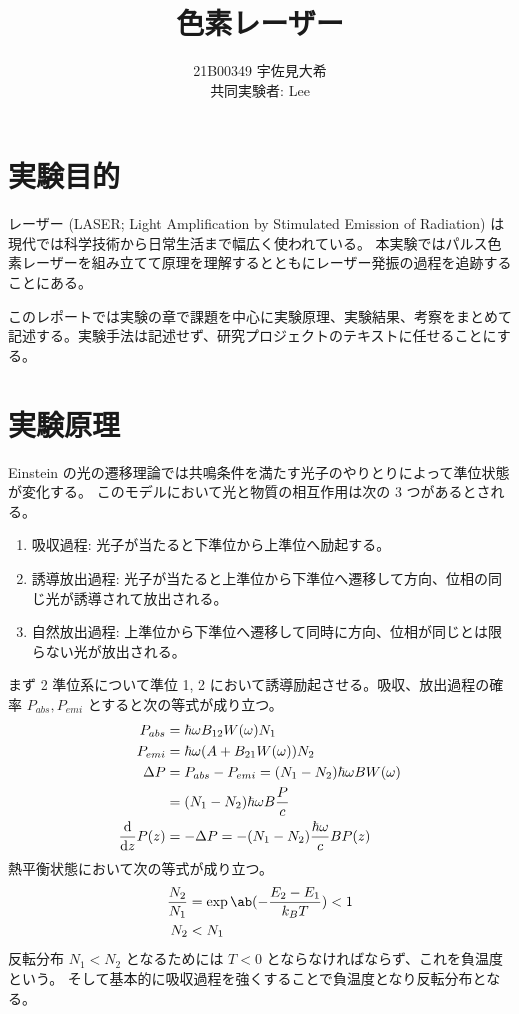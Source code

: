 \documentclass[uplatex,dvipdfmx,a4paper,11pt]{jlreq}
\title{色素レーザー}
\author{21B00349 宇佐見大希 \\ 共同実験者: Lee}
\numberwithin{equation}{section}
\theoremstyle{definition}
\begin{document}
\maketitle
\clearpage

\section{実験目的}
レーザー (LASER; Light Amplification by Stimulated Emission of Radiation) は現代では科学技術から日常生活まで幅広く使われている。
本実験ではパルス色素レーザーを組み立てて原理を理解するとともにレーザー発振の過程を追跡することにある。

このレポートでは実験の章で課題を中心に実験原理、実験結果、考察をまとめて記述する。実験手法は記述せず、研究プロジェクトのテキストに任せることにする。

\section{実験原理}

Einstein の光の遷移理論では共鳴条件を満たす光子のやりとりによって準位状態が変化する。
このモデルにおいて光と物質の相互作用は次の 3 つがあるとされる。
\begin{enumerate}
  \item 吸収過程: 光子が当たると下準位から上準位へ励起する。
  \item 誘導放出過程: 光子が当たると上準位から下準位へ遷移して方向、位相の同じ光が誘導されて放出される。
  \item 自然放出過程: 上準位から下準位へ遷移して同時に方向、位相が同じとは限らない光が放出される。
\end{enumerate}

まず 2 準位系について準位 1, 2 において誘導励起させる。吸収、放出過程の確率 $P_{abs}, P_{emi}$ とすると次の等式が成り立つ。
\begin{align}
  P_{abs}        & = \hbar\omega B_{12}W(\omega)N_1                        \\
  P_{emi}        & = \hbar\omega(A + B_{21}W(\omega))N_2                   \\
  \Delta P       & = P_{abs} - P_{emi} = (N_1 - N_2)\hbar\omega BW(\omega) \\
                 & = (N_1 - N_2)\hbar\omega B\frac{P}{c}                   \\
  \diff{}{z}P(z) & = -\Delta P = - (N_1 - N_2)\frac{\hbar\omega}{c}BP(z)
\end{align}
熱平衡状態において次の等式が成り立つ。
\begin{align}
  \frac{N_2}{N_1} & = \exp\ab(-\frac{E_2 - E_1}{k_BT}) < 1 \\
  N_2             & < N_1
\end{align}
反転分布 $N_1 < N_2$ となるためには $T < 0$ とならなければならず、これを負温度という。
そして基本的に吸収過程を強くすることで負温度となり反転分布となる。
\end{document}
